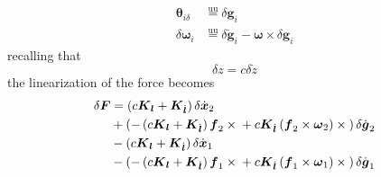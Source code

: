 \documentclass[10pt,dvips,fleqn,subeqn]{report}
\newcommand{\T}[1]{\boldsymbol{#1}}
\newcommand{\equu}{\overset{\text{uu}}{=}}
\begin{document}
\begin{align}
	\T{\theta}_{i\delta} &\equu \delta\T{g}_i \\
	\delta\T{\omega}_i &\equu \delta\dot{\T{g}}_i - \T{\omega}\times\delta\T{g}_i
\end{align}
recalling that
\begin{equation}
	\delta{z} = c \delta\dot{z}
\end{equation}
the linearization of the force becomes
\begin{align}
	\delta\T{F} &= \plbr{c\T{K}_{\T{l}} + \T{K}_{\dot{\T{l}}}} \delta\dot{\T{x}}_2
		\nonumber \\
		& + \plbr{
			- \plbr{c\T{K}_{\T{l}} + \T{K}_{\dot{\T{l}}}} \T{f}_2\times{}
			+ c \T{K}_{\dot{\T{l}}} \plbr{\T{f}_2 \times \T{\omega}_2}\times{}
		} \delta\dot{\T{g}}_2
		\nonumber \\
		& - \plbr{c\T{K}_{\T{l}} + \T{K}_{\dot{\T{l}}}} \delta\dot{\T{x}}_1
		\nonumber \\
		& - \plbr{
			- \plbr{c\T{K}_{\T{l}} + \T{K}_{\dot{\T{l}}}} \T{f}_1\times{}
			+ c \T{K}_{\dot{\T{l}}} \plbr{\T{f}_1 \times \T{\omega}_1}\times{}
		} \delta\dot{\T{g}}_1
\end{align}
\end{document}
